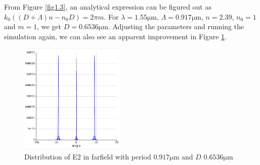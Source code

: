 \documentclass[fontsize=11pt]{scrartcl}
\begin{document}
From Figure \ref{fig1.3}, an analytical expression can be figured out as
$k_{0}\left((D+\Lambda) n-n_{0} D\right)=2 \pi m$. 
For $\lambda=1.55\mathrm{\mu m}$, $\Lambda=0.917\mathrm{\mu m}$, 
$n=2.39$, $n_0=1$ and $m=1$, we get $D=0.6536\mathrm{\mu m}$. 
Adjusting the parameters and running the simulation again, 
we can also see an apparent improvement in Figure \ref{fig1.6}.
\begin{figure}[H]
    \centering
     \includegraphics[width=0.45\textwidth]{img/fig1.6.png}
     \caption{Distribution of E2 in farfield with 
     period $0.917\mathrm{\mu m}$ and $D$ $0.6536\mathrm{\mu m}$}
     \label{fig1.6}
\end{figure}


\pagebreak
\end{document}
